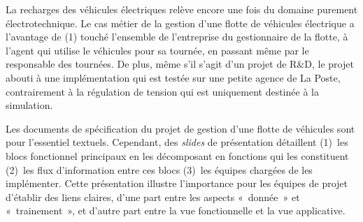 La recharges des véhicules électriques relève encore une fois du domaine 
purement électrotechnique. Le cas métier de la gestion d'une flotte de véhicules 
électrique a l'avantage de (1) touché l'ensemble de l'entreprise du gestionnaire 
de la flotte, à l'agent qui utilise le véhicules pour sa tournée, en passant 
même par le responsable des tournées.
De plus, même s'il s'agit d'un projet de R\&D, le projet abouti à une 
implémentation qui est testée sur une petite agence de La Poste, contrairement à 
la régulation de tension qui est uniquement destinée à la simulation.

Les documents de spécification du projet de gestion d'une flotte de véhicules 
sont pour l'essentiel textuels. Cependant, des \textit{slides} de présentation 
détaillent (1)~les blocs fonctionnel principaux en les décomposant en fonctions 
qui les constituent (2)~les flux d'information entre ces blocs (3)~les équipes 
chargées de les implémenter. Cette présentation illustre l'importance pour les 
équipes  de projet d'établir des liens claires, d'une part entre les aspects 
«~donnée~» et «~trainement~», et d'autre part entre la vue fonctionnelle et la 
vue applicative.

